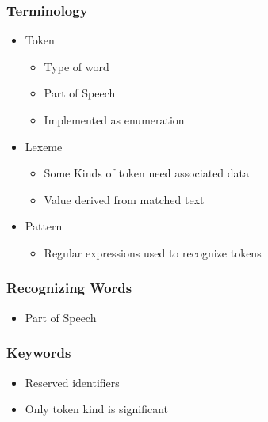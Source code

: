 \documentclass[usepdftitle=false,professionalfonts,compress ]{beamer}
\begin{document}
{
\begin{frame}\frametitle{Terminology}

	\begin{itemize}
	\item Token

	\begin{itemize}
	\item Type of word
			\item Part of Speech
			\item Implemented as enumeration
				\end{itemize}

			\item Lexeme

	\begin{itemize}
	\item Some Kinds of token need associated data
			\item Value derived from matched text
				\end{itemize}

			\item Pattern

	\begin{itemize}
	\item Regular expressions used to recognize tokens
				\end{itemize}

				\end{itemize}

\end{frame}}





{
\begin{frame}\frametitle{Recognizing Words}

	\begin{itemize}
	\item Part of Speech
				\end{itemize}

\end{frame}}



{
\begin{frame}\frametitle{Keywords}

	\begin{itemize}
	\item Reserved identifiers
			\item Only token kind is significant
				\end{itemize}

\end{frame}}
\end{document}
